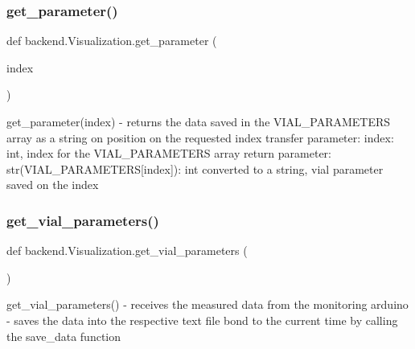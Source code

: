\subsubsection{\texorpdfstring{get\+\_\+parameter()}{get\_parameter()}}
{\footnotesize\ttfamily def backend.\+Visualization.\+get\+\_\+parameter (\begin{DoxyParamCaption}\item[{}]{index }\end{DoxyParamCaption})}

\begin{DoxyVerb}get_parameter(index)
    - returns the data saved in the VIAL_PARAMETERS array as a string on position on the requested index
transfer parameter:
    index: int, index for the VIAL_PARAMETERS array
return parameter:
    str(VIAL_PARAMETERS[index]): int converted to a string, vial parameter saved on the index
\end{DoxyVerb}
 \mbox{\label{classbackend_1_1Visualization_a8afefb6f1785a15f87ee0ccba4429db9_a8afefb6f1785a15f87ee0ccba4429db9}} 
\subsubsection{\texorpdfstring{get\+\_\+vial\+\_\+parameters()}{get\_vial\_parameters()}}
{\footnotesize\ttfamily def backend.\+Visualization.\+get\+\_\+vial\+\_\+parameters (\begin{DoxyParamCaption}{ }\end{DoxyParamCaption})}

\begin{DoxyVerb}get_vial_parameters()
    - receives the measured data from the monitoring arduino
    - saves the data into the respective text file bond to the current time by calling the save_data function
\end{DoxyVerb}
 \mbox{\label{classbackend_1_1Visualization_ae4a54d3ffecac64d5cc7e1b116a8b453_ae4a54d3ffecac64d5cc7e1b116a8b453}} 
